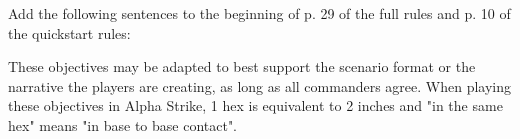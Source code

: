 Add the following sentences to the beginning of p. 29 of the full rules and p. 10 of the quickstart rules:

These objectives may be adapted to best support the scenario format or the narrative the players are creating, as long as all commanders agree.
When playing these objectives in Alpha Strike, 1 hex is equivalent to 2 inches and "in the same hex" means "in base to base contact".
